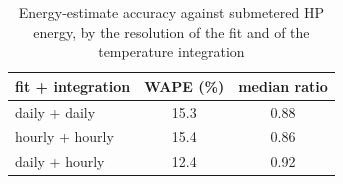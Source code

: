 \begin{table}[t]
\centering
\caption{Energy-estimate accuracy against submetered HP energy, by the resolution of the fit and of the temperature integration}
\label{tab:energy}
\begin{tabular}{lcc}
\toprule
fit + integration & WAPE (\%) & median ratio \\
\midrule
daily + daily & 15.3 & 0.88 \\
hourly + hourly & 15.4 & 0.86 \\
daily + hourly & 12.4 & 0.92 \\
\bottomrule
\end{tabular}
\end{table}